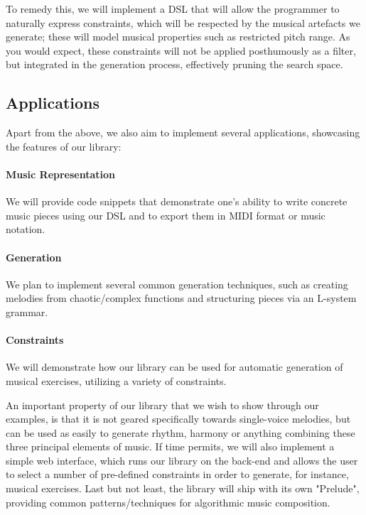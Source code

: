 \documentclass[12pt,a4paper]{article}
\begin{document}
To remedy this, we will implement a DSL that will allow the programmer to naturally express constraints, which will be respected by the musical artefacts we generate; these will model musical properties such as restricted pitch range. As you would expect, these constraints will not be applied posthumously as a filter, but integrated in the generation process, effectively pruning the search space.

\subsection{Applications}
Apart from the above, we also aim to implement several applications, showcasing the features of our library:
\vspace{-15pt}
\paragraph{Music Representation} We will provide code snippets that demonstrate one's ability to write concrete music pieces using our DSL and to export them in MIDI format or music notation.
\vspace{-15pt}
\paragraph{Generation} We plan to implement several common generation techniques, such as creating melodies from 
chaotic/complex functions and structuring pieces via an L-system grammar.
\vspace{-15pt}
\paragraph{Constraints} We will demonstrate how our library can be used for automatic generation of musical exercises, utilizing a variety of constraints.
\vspace{5pt}

An important property of our library that we wish to show through our examples, is that it is not geared specifically towards single-voice melodies, but can be used as easily to generate rhythm, harmony or anything combining these three principal elements of music.
If time permits, we will also implement a simple web interface, which runs our library on the back-end and allows the user to select a number of pre-defined constraints in order to generate, for instance, musical exercises.
Last but not least, the library will ship with its own "Prelude", providing common patterns/techniques for algorithmic music composition.
\end{document}
